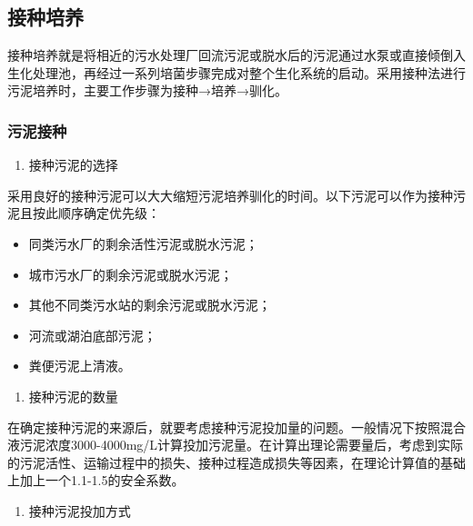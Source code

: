 \documentclass[
]{book}
\providecommand{\tightlist}{%
  \setlength{\itemsep}{0pt}\setlength{\parskip}{0pt}}
\begin{document}
\hypertarget{ux63a5ux79cdux57f9ux517b}{%
\subsection{接种培养}\label{ux63a5ux79cdux57f9ux517b}}

接种培养就是将相近的污水处理厂回流污泥或脱水后的污泥通过水泵或直接倾倒入生化处理池，再经过一系列培菌步骤完成对整个生化系统的启动。采用接种法进行污泥培养时，主要工作步骤为接种→培养→驯化。

\hypertarget{ux6c61ux6ce5ux63a5ux79cd}{%
\subsubsection{污泥接种}\label{ux6c61ux6ce5ux63a5ux79cd}}

\begin{enumerate}
\def\labelenumi{\arabic{enumi}.}
\tightlist
\item
  接种污泥的选择
\end{enumerate}

采用良好的接种污泥可以大大缩短污泥培养驯化的时间。以下污泥可以作为接种污泥且按此顺序确定优先级：

\begin{itemize}
\item
  同类污水厂的剩余活性污泥或脱水污泥；
\item
  城市污水厂的剩余污泥或脱水污泥；
\item
  其他不同类污水站的剩余污泥或脱水污泥；
\item
  河流或湖泊底部污泥；
\item
  粪便污泥上清液。
\end{itemize}

\begin{enumerate}
\def\labelenumi{\arabic{enumi}.}
\setcounter{enumi}{1}
\tightlist
\item
  接种污泥的数量
\end{enumerate}

在确定接种污泥的来源后，就要考虑接种污泥投加量的问题。一般情况下按照混合液污泥浓度3000-4000mg/L计算投加污泥量。在计算出理论需要量后，考虑到实际的污泥活性、运输过程中的损失、接种过程造成损失等因素，在理论计算值的基础上加上一个1.1-1.5的安全系数。

\begin{enumerate}
\def\labelenumi{\arabic{enumi}.}
\setcounter{enumi}{2}
\tightlist
\item
  接种污泥投加方式
\end{enumerate}
\end{document}
